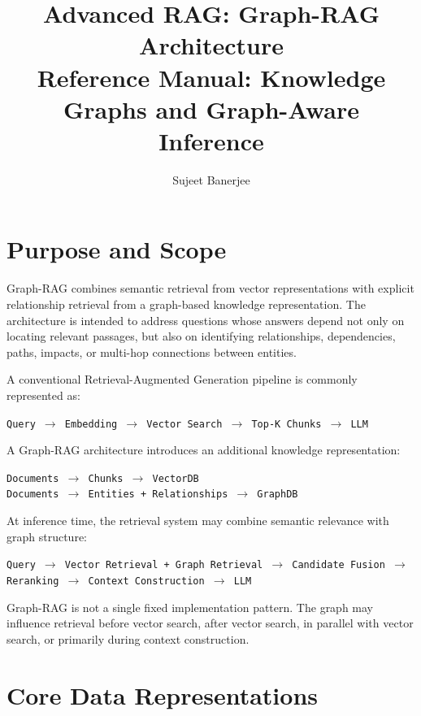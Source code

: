 \documentclass[11pt,a4paper]{article}
\title{\textbf{Advanced RAG: Graph-RAG Architecture}\\
\large Reference Manual: Knowledge Graphs and Graph-Aware Inference}
\author{Sujeet Banerjee}
\date{}
\begin{document}
\maketitle
\tableofcontents
\newpage

\section{Purpose and Scope}

Graph-RAG combines semantic retrieval from vector representations with explicit relationship retrieval from a graph-based knowledge representation. The architecture is intended to address questions whose answers depend not only on locating relevant passages, but also on identifying relationships, dependencies, paths, impacts, or multi-hop connections between entities.

A conventional Retrieval-Augmented Generation pipeline is commonly represented as:

\begin{center}
\texttt{Query $\rightarrow$ Embedding $\rightarrow$ Vector Search $\rightarrow$ Top-K Chunks $\rightarrow$ LLM}
\end{center}

A Graph-RAG architecture introduces an additional knowledge representation:

\begin{center}
\texttt{Documents $\rightarrow$ Chunks $\rightarrow$ VectorDB}\\
\texttt{Documents $\rightarrow$ Entities + Relationships $\rightarrow$ GraphDB}
\end{center}

At inference time, the retrieval system may combine semantic relevance with graph structure:

\begin{center}
\texttt{Query $\rightarrow$ Vector Retrieval + Graph Retrieval $\rightarrow$ Candidate Fusion $\rightarrow$ Reranking $\rightarrow$ Context Construction $\rightarrow$ LLM}
\end{center}

Graph-RAG is not a single fixed implementation pattern. The graph may influence retrieval before vector search, after vector search, in parallel with vector search, or primarily during context construction.

\section{Core Data Representations}
\end{document}
